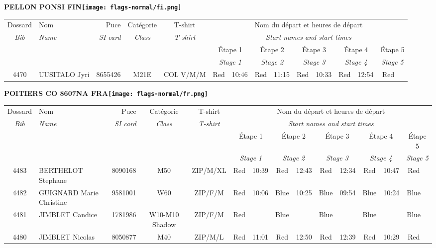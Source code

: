 \documentclass{report}
\begin{document}
\newpage
  \Huge \centering \bfseries PELLON PONSI  FIN\normalfont \footnotesize \sffamily \hfill \texttt{[image: flags-normal/fi.png]} \newline 
  \begin{longtable}{|c|l|r|c|c|*{5}{cc|}}
    Dossard & Nom  & Puce    & Catégorie & T-shirt & \multicolumn{10}{c|}{Nom du départ et heures de départ} \\
    \itshape Bib     & \itshape Name & \itshape SI card & \itshape Class  & \itshape  T-shirt  & \multicolumn{10}{c|}{\itshape Start names and start times} \\
    \hline
    & & & & & \multicolumn{2}{c|}{Étape 1} & \multicolumn{2}{c|}{Étape 2} & \multicolumn{2}{c|}{Étape 3} & \multicolumn{2}{c|}{Étape 4} & \multicolumn{2}{c|}{Étape 5} \\
    & & & & & \multicolumn{2}{c|}{\itshape Stage 1} & \multicolumn{2}{c|}{\itshape Stage 2} & \multicolumn{2}{c|}{\itshape Stage 3} & \multicolumn{2}{c|}{\itshape Stage 4} & \multicolumn{2}{c|}{\itshape Stage 5} \\
    \hline
    4470 & UUSITALO Jyri & 8655426 & M21E & COL V/M/M & Red & 10:46 & Red & 11:15 & Red & 10:33 & Red & 12:54 & Red &  \\
  \end{longtable}
\newpage
  \Huge \centering \bfseries POITIERS CO 8607NA FRA\normalfont \footnotesize \sffamily \hfill \texttt{[image: flags-normal/fr.png]} \newline 
  \begin{longtable}{|c|l|r|c|c|*{5}{cc|}}
    Dossard & Nom  & Puce    & Catégorie & T-shirt & \multicolumn{10}{c|}{Nom du départ et heures de départ} \\
    \itshape Bib     & \itshape Name & \itshape SI card & \itshape Class  & \itshape  T-shirt  & \multicolumn{10}{c|}{\itshape Start names and start times} \\
    \hline
    & & & & & \multicolumn{2}{c|}{Étape 1} & \multicolumn{2}{c|}{Étape 2} & \multicolumn{2}{c|}{Étape 3} & \multicolumn{2}{c|}{Étape 4} & \multicolumn{2}{c|}{Étape 5} \\
    & & & & & \multicolumn{2}{c|}{\itshape Stage 1} & \multicolumn{2}{c|}{\itshape Stage 2} & \multicolumn{2}{c|}{\itshape Stage 3} & \multicolumn{2}{c|}{\itshape Stage 4} & \multicolumn{2}{c|}{\itshape Stage 5} \\
    \hline
    4483 & BERTHELOT Stephane & 8090168 & M50 & ZIP/M/XL & Red & 10:39 & Red & 12:43 & Red & 12:34 & Red & 10:47 & Red &  \\
    4482 & GUIGNARD Marie Christine & 9581001 & W60 & ZIP/F/M & Red & 10:06 & Blue & 10:25 & Blue & 09:54 & Blue & 10:24 & Blue &  \\
    4481 & JIMBLET Candice & 1781986 & W10-M10 Shadow & ZIP/F/M & Red &   & Blue &   & Blue &   & Blue &   & Blue &  \\
    4480 & JIMBLET Nicolas & 8050877 & M40 & ZIP/M/L & Red & 11:01 & Red & 12:50 & Red & 12:39 & Red & 10:29 & Red &  \\
  \end{longtable}
\end{document}

